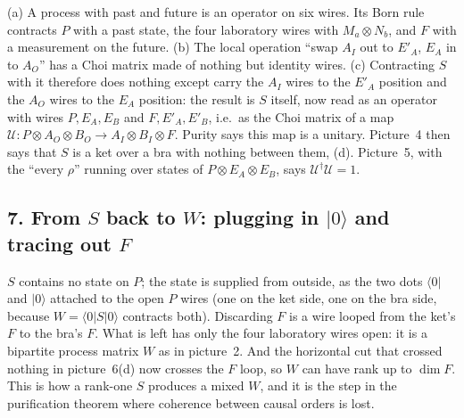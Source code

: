 \documentclass[11pt]{article}
\newcommand{\obox}[5]{\draw[thick,rounded corners=2pt,fill=black!8] (#1,#2) rectangle (#3,#4);\node at ({(#1+#3)/2},{(#2+#4)/2}) {#5};}
\begin{document}
(a) A process with past and future is an operator on six wires. Its Born rule contracts $P$ with a
past state, the four laboratory wires with $M_a\otimes N_b$, and $F$ with a measurement on the future.
(b) The local operation ``swap $A_I$ out to $E'_A$, $E_A$ in to $A_O$'' has a Choi matrix made of
nothing but identity wires. (c) Contracting $S$ with it therefore does nothing except carry the $A_I$
wires to the $E'_A$ position and the $A_O$ wires to the $E_A$ position: the result is $S$ itself, now
read as an operator with wires $P,E_A,E_B$ and $F,E'_A,E'_B$, i.e.\ as the Choi matrix of a map
$\mathcal U\colon P\otimes A_O\otimes B_O\to A_I\otimes B_I\otimes F$. Purity says this map is a unitary.
Picture~4 then says that $S$ is a ket over a bra with nothing between them, (d). Picture~5, with the
``every $\rho$'' running over states of $P\otimes E_A\otimes E_B$, says $\mathcal U^\dagger\mathcal U=1$.

\subsection*{7. From $S$ back to $W$: plugging in $|0\rangle$ and tracing out $F$}
\begin{center}
\end{center}
$S$ contains no state on $P$; the state is supplied from outside, as the two dots $\langle0|$ and
$|0\rangle$ attached to the open $P$ wires (one on the ket side, one on the bra side, because
$W=\langle0|S|0\rangle$ contracts both). Discarding $F$ is a wire looped from the ket's $F$ to the bra's
$F$. What is left has only the four laboratory wires open: it is a bipartite process matrix $W$ as in
picture~2. And the horizontal cut that crossed nothing in picture~6(d) now crosses the $F$ loop, so
$W$ can have rank up to $\dim F$. This is how a rank-one $S$ produces a mixed $W$, and it is the step
in the purification theorem where coherence between causal orders is lost.
\end{document}
